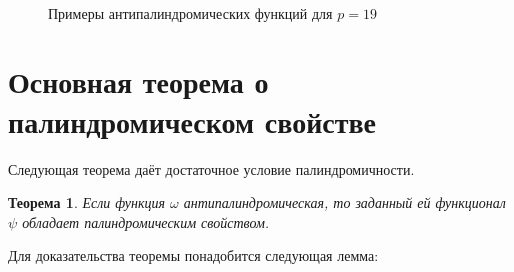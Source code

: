 \documentclass[14pt, a4paper, russian]{report}
\newtheorem{theorem}{\indent Теорема}
\begin{document}
\begin{figure}[!h]
    \\
    \caption{\footnotesize{Примеры антипалиндромических функций для $p=19$}}
\label{fig:antipalindromic}
\end{figure}

\section{Основная теорема о палиндромическом свойстве}
Следующая теорема даёт достаточное условие палиндромичности.

\begin{theorem}\label{palindromic_theorem}
Если функция $\omega$ антипалиндромическая, то заданный ей функционал $\psi$ обладает палиндромическим свойством.
\end{theorem}

Для доказательства теоремы понадобится следующая лемма:
\end{document}
